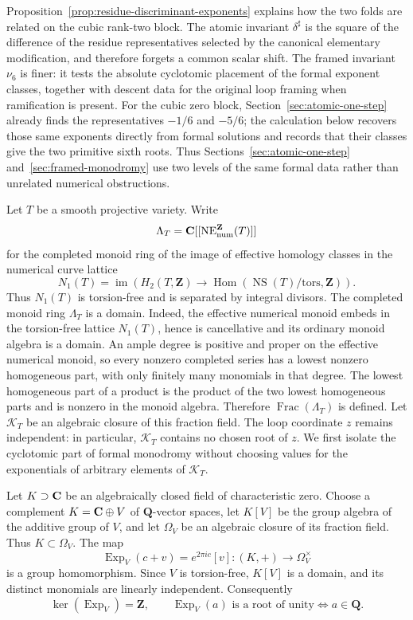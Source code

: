 Proposition~\ref{prop:residue-discriminant-exponents} explains how the two
folds are related on the cubic rank-two block.  The atomic invariant
\(\delta^\sharp\) is the square of the difference of the residue
representatives selected by the canonical
elementary modification, and therefore forgets a common scalar shift.  The
framed invariant \(\nu_6\) is finer: it tests the absolute cyclotomic
placement of the formal exponent classes, together with descent data for the
original loop framing when ramification is present.  For the cubic zero
block, Section~\ref{sec:atomic-one-step} already finds the representatives
\(-1/6\) and \(-5/6\); the calculation below
recovers those same exponents directly from formal solutions and records
that their classes give the two primitive sixth roots.  Thus
Sections~\ref{sec:atomic-one-step} and~\ref{sec:framed-monodromy} use two
levels of the same formal data rather than unrelated numerical obstructions.

Let \(T\) be a smooth projective variety.  Write
\[
 \Lambda_T=\mathbf C[[\operatorname{NE}^{\mathbf Z}_{\rm num}(T)]]
\]
for the completed monoid ring of the image of effective homology classes in
the numerical curve lattice
\[
 N_1(T)=\operatorname{im}\!\left(
 H_2(T,\mathbf Z)\longrightarrow
 \operatorname{Hom}(\operatorname{NS}(T)/\mathrm{tors},\mathbf Z)\right).
\]
Thus \(N_1(T)\) is torsion-free and is separated by integral divisors.  The
completed monoid ring \(\Lambda_T\) is a domain.  Indeed, the effective
numerical monoid embeds in the torsion-free lattice \(N_1(T)\), hence is
cancellative and its ordinary monoid algebra is a domain.  An ample degree
is positive and proper on the effective numerical monoid, so every nonzero
completed series has a lowest nonzero homogeneous part, with only finitely
many monomials in that degree.  The lowest homogeneous part of a product is
the product of the two lowest homogeneous parts and is nonzero in the monoid
algebra.  Therefore \(\operatorname{Frac}(\Lambda_T)\) is defined.  Let
\(\mathcal K_T\) be an algebraic closure of this fraction field.  The loop
coordinate \(z\) remains independent: in particular, \(\mathcal K_T\)
contains no chosen root of \(z\).  We first isolate the cyclotomic part of
formal monodromy without choosing values for the exponentials of arbitrary
elements of \(\mathcal K_T\).

Let \(K\supset\mathbf C\) be an algebraically closed field of characteristic zero.
Choose a complement \(K=\mathbf C\oplus V\) of \(\mathbf Q\)-vector spaces, let
\(K[V]\) be the group algebra of the additive group of \(V\), and let
\(\Omega_V\) be an algebraic closure of its fraction field.  Thus
\(K\subset\Omega_V\).  The map
\[
 \operatorname{Exp}_V(c+v)=e^{2\pi i c}[v]
 \colon (K,+)\longrightarrow\Omega_V^\times
 \label{eq:universal-exponential}
\]
is a group homomorphism.  Since \(V\) is torsion-free, \(K[V]\) is a domain,
and its distinct monomials are linearly independent.  Consequently
\[
 \ker(\operatorname{Exp}_V)=\mathbf Z,
 \qquad
 \operatorname{Exp}_V(a)\text{ is a root of unity}
 \Longleftrightarrow a\in\mathbf Q.
 \label{eq:universal-exponential-torsion}
\]

